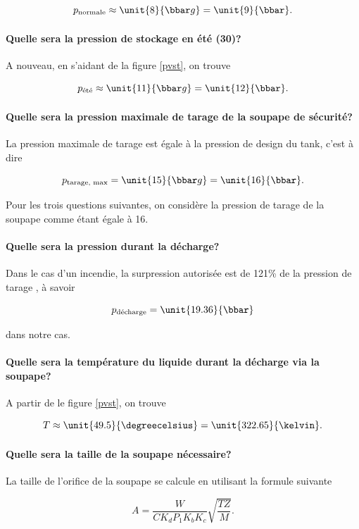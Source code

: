 $$p_{\text{normale}} \approx \unit{8}{\bbar g} = \unit{9}{\bbar}.$$

\paragraph{Quelle sera la pression de stockage en été 
(\unit{30}{\degreecelsius})?}
A nouveau, en s'aidant de la figure \ref{pvst}, on trouve

$$p_{\text{été}} \approx \unit{11}{\bbar g} = \unit{12}{\bbar}.$$

\paragraph{Quelle sera la pression maximale de tarage
de la soupape de sécurité?}
La pression maximale de tarage est égale à la pression de 
design du tank, c'est à dire

$$p_{\text{tarage, max}} = \unit{15}{\bbar g} = \unit{16}{\bbar}.$$

Pour les trois questions suivantes, on considère la pression
de tarage de la soupape comme étant égale à \unit{16}{\bbar}.

\paragraph{Quelle sera la pression durant la décharge?}
Dans le cas d'un incendie, la surpression autorisée est de 121\%
de la pression de tarage \cite{mignon}, à savoir 

$$p_{\text{décharge}} = \unit{19.36}{\bbar}$$

dans notre cas.

\paragraph{Quelle sera la température du liquide durant
la décharge via la soupape?}
A partir de le figure \ref{pvst}, on trouve 

$$T \approx \unit{49.5}{\degreecelsius} = \unit{322.65}{\kelvin}.$$

\paragraph{Quelle sera la taille de la soupape nécessaire?}
La taille de l'orifice de la soupape se calcule en utilisant la formule
suivante\cite{mignon} 

$$A = \frac{W}{CK_dP_1K_bK_c}\sqrt{\frac{TZ}{M}}.$$

